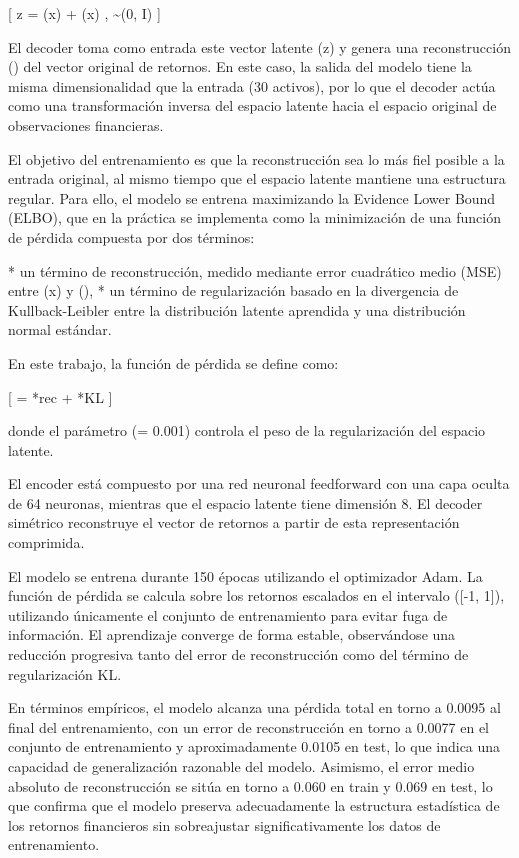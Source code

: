 [
z = \mu(x) + \sigma(x) \cdot \epsilon, \quad \epsilon \sim {}(0, I)
]

El decoder toma como entrada este vector latente (z) y genera una reconstrucción () del vector original de retornos. En este caso, la salida del modelo tiene la misma dimensionalidad que la entrada (30 activos), por lo que el decoder actúa como una transformación inversa del espacio latente hacia el espacio original de observaciones financieras.

El objetivo del entrenamiento es que la reconstrucción sea lo más fiel posible a la entrada original, al mismo tiempo que el espacio latente mantiene una estructura regular. Para ello, el modelo se entrena maximizando la Evidence Lower Bound (ELBO), que en la práctica se implementa como la minimización de una función de pérdida compuesta por dos términos:

* un término de reconstrucción, medido mediante error cuadrático medio (MSE) entre (x) y (),
* un término de regularización basado en la divergencia de Kullback-Leibler entre la distribución latente aprendida y una distribución normal estándar.

En este trabajo, la función de pérdida se define como:

[
 = *{rec} + \beta {}*{KL}
]

donde el parámetro (\beta = 0.001) controla el peso de la regularización del espacio latente.

El encoder está compuesto por una red neuronal feedforward con una capa oculta de 64 neuronas, mientras que el espacio latente tiene dimensión 8. El decoder simétrico reconstruye el vector de retornos a partir de esta representación comprimida.

El modelo se entrena durante 150 épocas utilizando el optimizador Adam. La función de pérdida se calcula sobre los retornos escalados en el intervalo ([-1, 1]), utilizando únicamente el conjunto de entrenamiento para evitar fuga de información. El aprendizaje converge de forma estable, observándose una reducción progresiva tanto del error de reconstrucción como del término de regularización KL.

En términos empíricos, el modelo alcanza una pérdida total en torno a 0.0095 al final del entrenamiento, con un error de reconstrucción en torno a 0.0077 en el conjunto de entrenamiento y aproximadamente 0.0105 en test, lo que indica una capacidad de generalización razonable del modelo. Asimismo, el error medio absoluto de reconstrucción se sitúa en torno a 0.060 en train y 0.069 en test, lo que confirma que el modelo preserva adecuadamente la estructura estadística de los retornos financieros sin sobreajustar significativamente los datos de entrenamiento.


